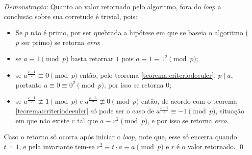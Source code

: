 \begin{enumerate}
    \textit{Demonstração}: Quanto ao valor retornado pelo algoritmo, fora do \textit{loop} a conclusão sobre sua corretude é trivial, pois:
        \begin{itemize}
            \item Se $p$ não é primo, por ser quebrada a hipótese em que se baseia o algoritmo ($p$ ser primo) se retorna \textit{erro};
            \item se $a \equiv 1 \pmod{p}$ basta retornar $1$ pois $a \equiv 1 \equiv 1^2 \pmod{p}$;
            \item se $a^{\frac{p-1}{2}} \equiv 0 \pmod{p}$ então, pelo teorema \ref{teorema:criteriodeeuler}, $p \mid a$, portanto $a \equiv 0 \equiv 0^2 \pmod{p}$, por isso se retorna $0$;
            \item se $a^{\frac{p-1}{2}} \not\equiv 1 \pmod{p}$
            e $a^{\frac{p-1}{2}} \not\equiv 0 \pmod{p}$ então, de acordo com o teorema \ref{teorema:criteriodeeuler} só pode ser o caso de $a^{\frac{p-1}{2}} \equiv -1 \pmod{p}$, situação em que não existe $r$ tal que $a \equiv r^2 \pmod{p}$, e por isso se retorna \textit{erro}.
        \end{itemize}
    Caso o retorno só ocorra após iniciar o \textit{loop}, note que, esse só encerra quando $t = 1$, e pela invariante tem-se $r^2 \equiv t \cdot a \equiv a \pmod{p}$ e $r$ é o valor retornado. \qed 
\end{enumerate}